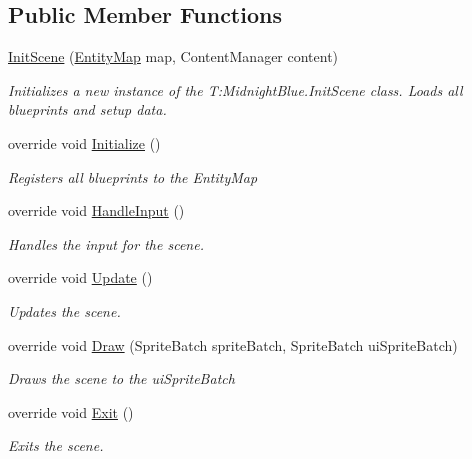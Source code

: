 \subsection*{Public Member Functions}
\begin{DoxyCompactItemize}
\item 
\hyperlink{class_midnight_blue_1_1_init_scene_a6458d599d89e074484645974a1975f46}{Init\+Scene} (\hyperlink{class_m_b2_d_1_1_entity_component_1_1_entity_map}{Entity\+Map} map, Content\+Manager content)
\begin{DoxyCompactList}\small\item\em Initializes a new instance of the T\+:\+Midnight\+Blue.\+Init\+Scene class. Loads all blueprints and setup data. \end{DoxyCompactList}\item 
override void \hyperlink{class_midnight_blue_1_1_init_scene_a99eee8cc5dab8d7263591aeaa50144fb}{Initialize} ()
\begin{DoxyCompactList}\small\item\em Registers all blueprints to the Entity\+Map \end{DoxyCompactList}\item 
override void \hyperlink{class_midnight_blue_1_1_init_scene_a4a8d9c22193d334e41685ce62fa11dd9}{Handle\+Input} ()
\begin{DoxyCompactList}\small\item\em Handles the input for the scene. \end{DoxyCompactList}\item 
override void \hyperlink{class_midnight_blue_1_1_init_scene_ad87861fb4f2a30f5168f6133aa10d3f4}{Update} ()
\begin{DoxyCompactList}\small\item\em Updates the scene. \end{DoxyCompactList}\item 
override void \hyperlink{class_midnight_blue_1_1_init_scene_a5d6b21ff45a6c14edcf0bd8318133725}{Draw} (Sprite\+Batch sprite\+Batch, Sprite\+Batch ui\+Sprite\+Batch)
\begin{DoxyCompactList}\small\item\em Draws the scene to the ui\+Sprite\+Batch \end{DoxyCompactList}\item 
override void \hyperlink{class_midnight_blue_1_1_init_scene_a16fc773b06a711e1ba35dda44e3edc3e}{Exit} ()
\begin{DoxyCompactList}\small\item\em Exits the scene. \end{DoxyCompactList}\item 

\end{DoxyCompactItemize}
